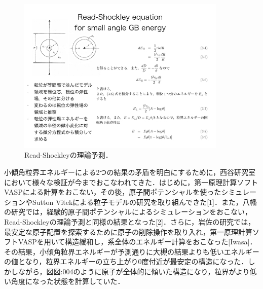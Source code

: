 \begin{figure}[htbp]\begin{center}
\includegraphics[width=10cm,bb= 0 0 737 553]{../figs/./boundary_narita.003.jpeg}
\caption{Read-Shockleyの理論予測．}
\label{default}\end{center}\end{figure}
小傾角粒界エネルギーによる2つの結果の矛盾を明白にするために，西谷研究室において様々な検証が今までおこなわれてきた．はじめに，第一原理計算ソフトVASPによる計算をおこない，その後，原子間ポテンシャルを使ったシミュレーションやSutton Vitekによる粒子モデルの研究を取り組んできた[1]．また，八幡の研究では，経験的原子間ポテンシャルによるシミュレーションをおこない，Read-Shockleyの理論予測と同様の結果となった[2]．さらに，岩佐の研究では，最安定な原子配置を探索するために原子の削除操作を取り入れ，第一原理計算ソフトVASPを用いて構造緩和し，系全体のエネルギー計算をおこなった[Iwasa]．その結果，小傾角粒界エネルギーが予測通りに大槻の結果よりも低いエネルギーの値となり，粒界エネルギーの立ち上がり0度付近が最安定の構造になった．しかしながら，図{図:004}のように原子が全体的に傾いた構造になり，粒界がより低い角度になった状態を計算していた．

